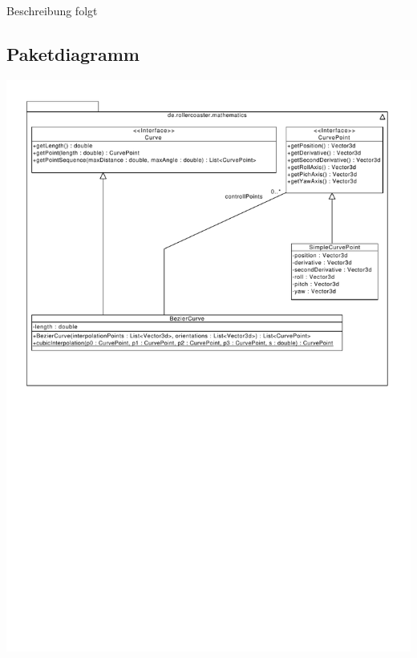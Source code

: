 Beschreibung folgt

\subsection{Paketdiagramm}

\includegraphics[width=\linewidth]{bilder/Mathematics}
